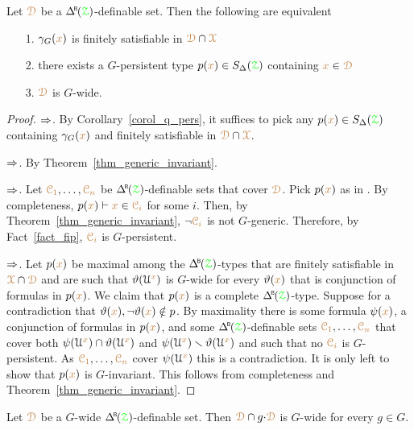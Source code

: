 \begin{theorem}\label{thm_generic_invariant2}
  Let ${\color{brown}\EuScript D}$ be a $\BDelta(\grZ)$-definable set.
  Then the following are equivalent 
  \begin{itemize}
    \item[1.] $\gamma_G({\color{brown} x})$ is finitely satisfiable in ${\color{brown}\EuScript D}\cap{\color{brown}\EuScript X}$
    \item[2.] there exists a $G$-persistent type $p({\color{brown} x})\in S_\Delta({\color{green}\EuScript Z})$ containing ${\color{brown} x}\in{\color{brown}\EuScript D}$
    \item[3.] ${\color{brown}\EuScript D}$ is $G$-wide.
  \end{itemize}
\end{theorem}

\begin{proof}
  $\Rightarrow$.
  By Corollary~\ref{corol_q_pers}, it suffices to pick any $p({\color{brown} x})\in S_\Delta({\color{green}\EuScript Z})$ containing $\gamma_G({\color{brown} x})$ and finitely satisfiable in ${\color{brown}\EuScript D}\cap{\color{brown}\EuScript X}$.
  
  $\Rightarrow$.
  By Theorem~\ref{thm_generic_invariant}.

  $\Rightarrow$.
  Let ${\color{brown}\EuScript C_1},\dots,{\color{brown}\EuScript C_n}$ be $\BDelta({\grZ})$-definable sets that cover ${\color{brown}\EuScript D}$.
  Pick $p({\color{brown} x})$ as in .
  By completeness, $p({\color{brown} x})\vdash {\color{brown}x}\in{\color{brown}\EuScript C_i}$ for some $i$.
  Then, by Theorem~\ref{thm_generic_invariant}, $\neg{\color{brown}\EuScript C_i}$ is not $G$-generic.
  Therefore, by Fact~\ref{fact_fip}, ${\color{brown}\EuScript C_i}$ is $G$-persistent.

  $\Rightarrow$.
  Let $p({\color{brown} x})$ be maximal among the $\BDelta({\grZ})$-types that are finitely satisfiable in ${\color{brown}\EuScript X}\cap{\color{brown}\EuScript D}$ and are such that $\vartheta(\EuScript U^{\color{brown} x})$ is $G$-wide for every $\vartheta({\color{brown} x})$ that is conjunction of formulas in $p({\color{brown} x})$.
  We claim that $p({\color{brown} x})$ is a complete $\BDelta({\grZ})$-type.
  Suppose for a contradiction that $\vartheta({\color{brown} x}),\neg\vartheta({\color{brown} x})\notin p$.
  By maximality there is some formula $\psi({\color{brown} x})$, a conjunction of formulas in $p({\color{brown} x})$, and some $\BDelta({\grZ})$-definable sets ${\color{brown}\EuScript C_1},\dots,{\color{brown}\EuScript C_n}$ that cover both $\psi(\EuScript U^{\color{brown} x})\cap\vartheta(\EuScript U^{\color{brown} x})$ and $\psi(\EuScript U^{\color{brown} x})\smallsetminus\vartheta(\EuScript U^{\color{brown} x})$ and such that no ${\color{brown}\EuScript C_i}$ is $G$-persistent.
  As ${\color{brown}\EuScript C_1},\dots,{\color{brown}\EuScript C_n}$ cover $\psi(\EuScript U^{\color{brown} x})$ this is a contradiction.
  It is only left to show that $p({\color{brown} x})$ is $G$-invariant.
  This follows from completeness and Theorem~\ref{thm_generic_invariant}.
\end{proof}

\begin{corollary}\label{corol_intersectionGwide}
  Let ${\color{brown}\EuScript D}$ be a $G$-wide $\BDelta(\grZ)$-definable set.
  Then ${\color{brown}\EuScript D}\cap g{\cdot}{\color{brown}\EuScript D}$ is $G$-wide for every $g\in G$.
\end{corollary}

